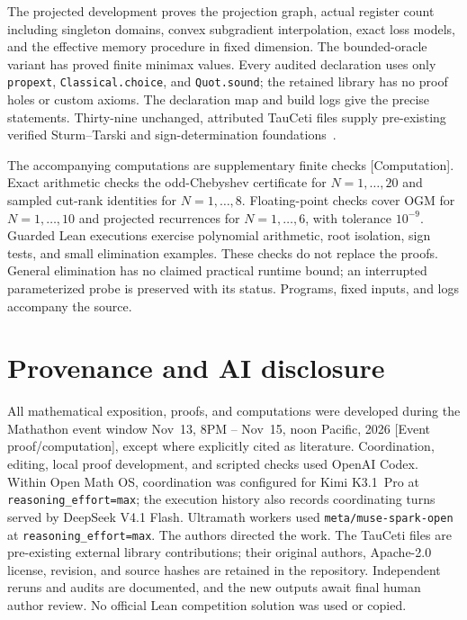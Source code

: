 \documentclass[11pt]{article}
\newcommand{\supportlabel}[1]{\textcolor{blue!60!black}{\small\textsf{[#1]}}}
\newcommand{\computation}{\supportlabel{Computation}}
\numberwithin{equation}{section}
\theoremstyle{definition}
\begin{document}
The projected development proves the projection graph, actual register
count including singleton domains, convex subgradient interpolation, exact
loss models, and the effective memory procedure in fixed dimension.
The bounded-oracle variant has proved finite minimax values. Every audited
declaration uses only \texttt{propext}, \texttt{Classical.choice}, and
\texttt{Quot.sound}; the retained library has no proof holes or custom axioms.
The declaration map and build logs give the precise statements. Thirty-nine
unchanged, attributed TauCeti files supply pre-existing verified
Sturm--Tarski and sign-determination foundations~\cite{TauCeti}.

The accompanying computations are supplementary finite checks \computation.
Exact arithmetic checks the odd-Chebyshev certificate for $N=1,\ldots,20$
and sampled cut-rank identities for $N=1,\ldots,8$. Floating-point checks
cover OGM for $N=1,\ldots,10$ and projected recurrences for $N=1,\ldots,6$,
with tolerance $10^{-9}$. Guarded Lean executions exercise polynomial
arithmetic, root isolation, sign tests, and small elimination examples.
These checks do not replace the proofs. General elimination has no claimed
practical runtime bound; an interrupted parameterized probe is preserved
with its status. Programs, fixed inputs, and logs accompany the source.

\section*{Provenance and AI disclosure}
All mathematical exposition, proofs, and computations were developed
during the Mathathon event window Nov~13, 8PM -- Nov~15, noon Pacific, 2026
\supportlabel{Event proof/computation}, except where explicitly cited as literature.
Coordination, editing, local proof development, and scripted checks used OpenAI Codex.
Within Open Math OS, coordination was configured for Kimi K3.1~Pro at
\texttt{reasoning\_effort=max}; the execution history also records coordinating
turns served by DeepSeek V4.1 Flash. Ultramath workers used
\texttt{meta/muse-spark-open} at \texttt{reasoning\_effort=max}. The authors directed
the work. The TauCeti files are pre-existing external library contributions;
their original authors, Apache-2.0 license, revision, and source hashes are
retained in the repository. Independent reruns and audits are documented, and the new
outputs await final human author review. No official Lean competition solution was used or copied.
\end{document}
